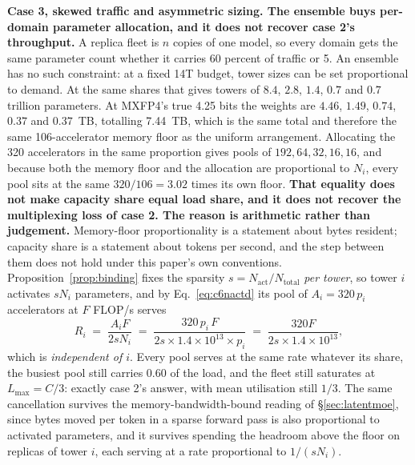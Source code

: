 \documentclass[11pt]{article}
\begin{document}
\textbf{Case 3, skewed traffic and asymmetric sizing. The ensemble buys per-domain parameter allocation, and it does not recover case 2's throughput.} A replica fleet is $n$ copies of one model, so every domain gets the same parameter count whether it carries 60 percent of traffic or 5. An ensemble has no such constraint: at a fixed 14T budget, tower sizes can be set proportional to demand. At the same shares that gives towers of $8.4$, $2.8$, $1.4$, $0.7$ and $0.7$ trillion parameters. At MXFP4's true 4.25 bits the weights are $4.46$, $1.49$, $0.74$, $0.37$ and $0.37$~TB, totalling 7.44~TB, which is the same total and therefore the same 106-accelerator memory floor as the uniform arrangement. Allocating the 320 accelerators in the same proportion gives pools of $192, 64, 32, 16, 16$, and because both the memory floor and the allocation are proportional to $N_i$, every pool sits at the same $320/106 = 3.02$ times its own floor. \textbf{That equality does not make capacity share equal load share, and it does not recover the multiplexing loss of case 2. The reason is arithmetic rather than judgement.} Memory-floor proportionality is a statement about bytes resident; capacity share is a statement about tokens per second, and the step between them does not hold under this paper's own conventions. Proposition~\ref{prop:binding} fixes the sparsity $s = N_{\mathrm{act}}/N_{\mathrm{total}}$ \emph{per tower}, so tower $i$ activates $s N_i$ parameters, and by Eq.~\eqref{eq:c6nactd} its pool of $A_i = 320\,p_i$ accelerators at $F$ FLOP/s serves
\[
R_i \;=\; \frac{A_i F}{2 s N_i} \;=\; \frac{320\, p_i\, F}{2 s \times 1.4\times10^{13} \times p_i} \;=\; \frac{320 F}{2 s \times 1.4\times10^{13}},
\]
which is \emph{independent of $i$}. Every pool serves at the same rate whatever its share, the busiest pool still carries $0.60$ of the load, and the fleet still saturates at $L_{\max} = C/3$: exactly case 2's answer, with mean utilisation still $1/3$. The same cancellation survives the memory-bandwidth-bound reading of \S\ref{sec:latentmoe}, since bytes moved per token in a sparse forward pass is also proportional to activated parameters, and it survives spending the headroom above the floor on replicas of tower $i$, each serving at a rate proportional to $1/(s N_i)$.
\end{document}
